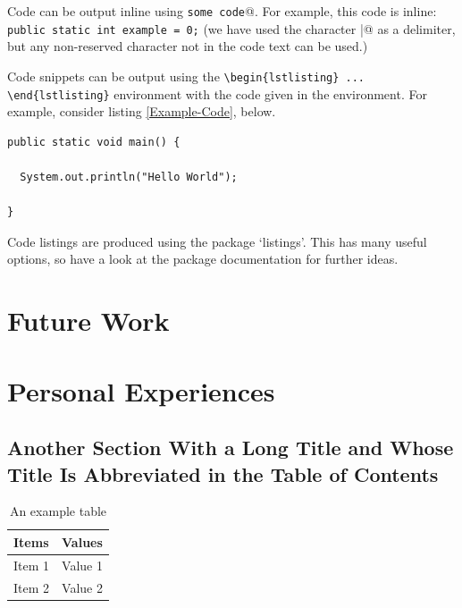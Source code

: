 \documentclass[12pt,a4paper]{report}
\theoremstyle{definition}
\begin{document}
Code can be output inline using \verb@\lstinline|some code|@.  For example, this code is inline: \lstinline|public static int example = 0;| (we have used the character \verb@|@ as a delimiter, but any non-reserved character not in the code text can be used.)

Code snippets can be output using the \verb|\begin{lstlisting} ... \end{lstlisting}|
environment with the code given in the environment. For example, consider listing \ref{Example-Code}, below.

\begin{lstlisting}[breaklines,breakatwhitespace,caption={Example code},label=Example-Code]
public static void main() {

  System.out.println("Hello World");

}
\end{lstlisting}

Code listings are produced using the package `listings'.  This has many useful options, so have a look at the package documentation for further ideas.

\chapter{Future Work}

\chapter{Personal Experiences}

\section[Short Section Title]{Another Section With a Long Title and Whose Title Is Abbreviated in the Table of Contents}

\begin{table}[htb]
\caption{An example table}
\bigskip
\begin{center}
\label{Example-Table}
\begin{tabular}{|l|l|}
\hline
Items & Values \\
\hline
\hline
Item 1 & Value 1 \\
Item 2 & Value 2 \\
\hline
\end{tabular}
\end{center}
\end{table}
\end{document}
